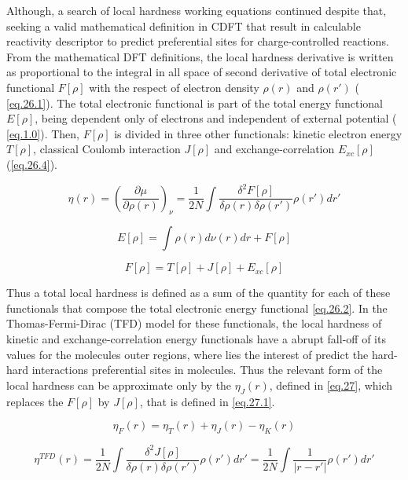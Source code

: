 \documentclass[a4paper,11pt]{refart}
\begin{document}
Although, a search of local hardness working equations continued despite that, seeking a valid mathematical definition in CDFT that result in calculable reactivity descriptor to predict preferential sites for charge-controlled reactions. From the mathematical DFT definitions, the local hardness derivative is written as proportional to the integral in all space of second derivative of total electronic functional $F[\rho]$ with the respect of electron density $\rho(r)$ and $\rho(r')$ ( \autoref{eq.26.1}). The total electronic functional is part of the total energy functional $E[\rho]$, being dependent only of electrons and independent of external potential ( \autoref{eq.1.0}).
Then,   $F[\rho]$ is divided in three other functionals: kinetic electron energy $T[\rho]$, classical Coulomb interaction $J[\rho]$ and  exchange-correlation $E_{xc}[\rho]$ (\autoref{eq.26.4}).

\begin{equation}
\eta(r) = \left( \frac{\partial \mu}{\partial \rho(r) } \right)_\nu = \frac{1}{2N} \int \frac{\delta^2 F[\rho]}{\delta \rho(r) \delta \rho(r')} \rho(r')dr'
\label{eq.26.1}
\end{equation}

\begin{equation}
E[\rho] =  \int \rho(r) d \nu (r) dr + F[\rho]
\label{eq.1.0}
\end{equation}

\begin{equation}
F[\rho] = T[\rho] + J[\rho] + E_{xc}[\rho]
\label{eq.26.4}
\end{equation}

Thus a total local hardness is defined as a sum of the quantity for each of these functionals that compose the total electronic energy functional \autoref{eq.26.2}. In the Thomas-Fermi-Dirac (TFD) model for these functionals, the local hardness of kinetic and exchange-correlation energy functionals have a abrupt fall-off of its values for the molecules outer regions, where lies the interest of predict the hard-hard interactions preferential sites in molecules. Thus the relevant form of the local hardness can be approximate only by the $\eta_J(r)$, defined in \autoref{eq.27}, which replaces the $F[\rho]$ by $J[\rho]$, that is defined in \autoref{eq.27.1}.

\begin{equation}
\eta_{F} (r) = \eta_{T}(r)+ \eta_{J}(r) - \eta_{K}(r)
\label{eq.26.2}
\end{equation}

\begin{equation}
\eta^{TFD} (r) = \frac{1}{2N} \int \frac{\delta^2 J[\rho]}{\delta \rho(r) \delta \rho(r')} \rho(r')dr' = \frac{1}{2N} \int \frac{1}{|r-r'|} \rho(r') dr'
\label{eq.27} 
\end{equation}
\end{document}
